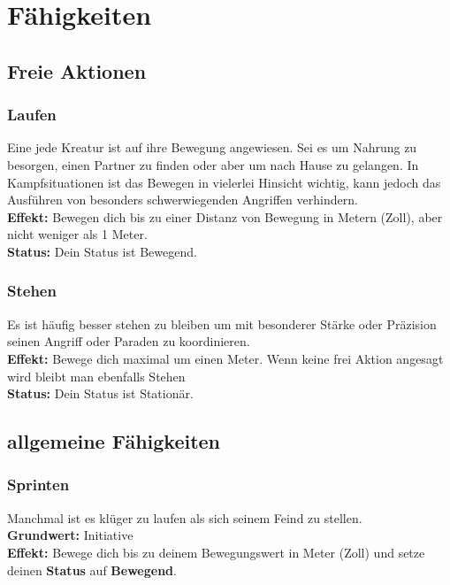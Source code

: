 \chapter{Fähigkeiten}

\section{Freie Aktionen} \label{freie_aktionen}

\subsection*{Laufen} \label{sk:laufen}
Eine jede Kreatur ist auf ihre Bewegung angewiesen. Sei es um Nahrung zu besorgen, einen Partner zu finden oder aber um nach Hause zu gelangen. In Kampfsituationen ist das Bewegen in vielerlei Hinsicht wichtig, kann jedoch das Ausführen von besonders schwerwiegenden Angriffen verhindern.\\
\textbf{Effekt:} Bewegen dich bis zu einer Distanz von Bewegung in Metern (Zoll), aber nicht weniger als 1 Meter.\\
\textbf{Status:} Dein Status ist Bewegend.

\subsection*{Stehen} \label{sk:stehen}
Es ist häufig besser stehen zu bleiben um mit besonderer Stärke oder Präzision seinen Angriff oder Paraden zu koordinieren.\\
\textbf{Effekt:} Bewege dich maximal um einen Meter. Wenn keine frei Aktion angesagt wird bleibt man ebenfalls Stehen\\
\textbf{Status:} Dein Status ist Stationär.

\section{allgemeine Fähigkeiten} \label{allgemeinskills}

\subsection*{Sprinten} \label{sk:sprinten}
Manchmal ist es klüger zu laufen als sich seinem Feind zu stellen.\\
\textbf{Grundwert:} Initiative \\
\textbf{Effekt:} Bewege dich bis zu deinem Bewegungswert in Meter (Zoll) und setze deinen \textbf{Status} auf \textbf{Bewegend}.

